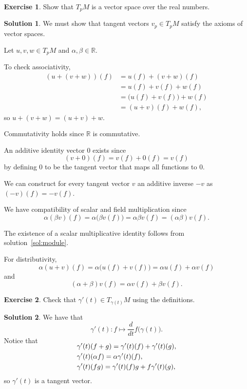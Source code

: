 \documentclass[11pt, a4paper]{report}
\theoremstyle{definition}
\newtheorem{ex}{Exercise}[part]
\newtheorem{sol}{Solution}[part]
\begin{document}
\begin{ex}

Show that $T_p M$ is a vector space over the real numbers.

\end{ex}

\begin{sol}

We must show that tangent vectors $v_p \in T_p M$ satisfy the axioms of vector spaces.

Let $u, v, w \in T_p M$ and $\alpha, \beta \in \mathbb{R}$.

To check associativity,
\begin{align*}
    (u + (v + w))(f) &= u(f) + (v + w)(f) \\
                     &= u(f) + v(f) + w(f) \\
                     &= \bigl(u(f) + v(f)\bigr) + w(f) \\
                     &= (u + v)(f) + w(f),
\end{align*}
so $u + (v + w) = (u + v) + w$.

Commutativity holds since $\mathbb{R}$ is commutative.

An additive identity vector $0$ exists since
\[
    (v + 0)(f) = v(f) + 0(f) = v(f)
\]
by defining $0$ to be the tangent vector that maps all functions to $0$.

We can construct for every tangent vector $v$ an additive inverse $-v$ as $(-v)(f) = -v(f)$.

We have compatibility of scalar and field multiplication since
\[
    \alpha(\beta v)(f) = \alpha \bigl(\beta v(f)\bigr)
        = \alpha \beta v(f) = (\alpha \beta) v(f).
\]

The existence of a scalar multiplicative identity follows from solution~\ref{sol:module}.

For distributivity,
\[
    \alpha(u + v)(f) = \alpha \bigl(u(f) + v(f)\bigr) = \alpha u(f) + \alpha v(f)
\]
and
\[
    (\alpha + \beta) v(f) = \alpha v(f) + \beta v(f).
\]

\end{sol}

\begin{ex}

Check that $\gamma'(t) \in T_{\gamma(t)}M$ using the definitions.

\end{ex}

\begin{sol}

We have that
\[
    \gamma'(t): f \mapsto \frac{d}{dt} f\bigl( \gamma(t) \bigr).
\]
Notice that
\begin{align*}
    \SwapAboveDisplaySkip
    &\gamma'(t)(f + g) = \gamma'(t)(f) + \gamma'(t)(g), \\
    &\gamma'(t)(\alpha f) = \alpha \gamma'(t)(f), \\
    &\gamma'(t)(f g) = \gamma'(t)(f) g + f \gamma'(t)(g),
\end{align*}
so $\gamma'(t)$ is a tangent vector.

\end{sol}
\end{document}
